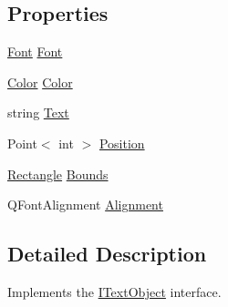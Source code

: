 \subsection*{Properties}
\begin{DoxyCompactItemize}
\item 
\hyperlink{class_tri_devs_1_1_tri_engine2_d_1_1_text_1_1_font}{Font} \hyperlink{class_tri_devs_1_1_tri_engine2_d_1_1_text_1_1_text_object_a98860724ada9531b20cc846a27cb8474}{Font}
\item 
\hyperlink{struct_tri_devs_1_1_tri_engine2_d_1_1_color}{Color} \hyperlink{class_tri_devs_1_1_tri_engine2_d_1_1_text_1_1_text_object_a67278178c6955621b9ebd0d616fbe8ac}{Color}
\item 
string \hyperlink{class_tri_devs_1_1_tri_engine2_d_1_1_text_1_1_text_object_a0dce4ff36f856afc71b4959b35e3532e}{Text}
\item 
Point$<$ int $>$ \hyperlink{class_tri_devs_1_1_tri_engine2_d_1_1_text_1_1_text_object_aa435399fa007f05799ddbf347186497b}{Position}
\item 
\hyperlink{struct_tri_devs_1_1_tri_engine2_d_1_1_rectangle}{Rectangle} \hyperlink{class_tri_devs_1_1_tri_engine2_d_1_1_text_1_1_text_object_af2a650b14fc3bab0401cf6cdf2de500e}{Bounds}
\item 
Q\-Font\-Alignment \hyperlink{class_tri_devs_1_1_tri_engine2_d_1_1_text_1_1_text_object_a3c59472099b0820dc92263fdffb1e864}{Alignment}
\end{DoxyCompactItemize}


\subsection{Detailed Description}
Implements the \hyperlink{interface_tri_devs_1_1_tri_engine2_d_1_1_text_1_1_i_text_object}{I\-Text\-Object} interface. 



